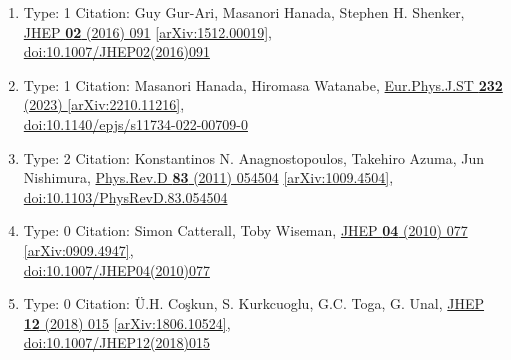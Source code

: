 \documentclass[a4paper,10pt]{article}
\begin{document}
\begin{enumerate}
\begin{enumerate}
  \item Type: 1 Citation: Guy Gur-Ari, Masanori Hanada, Stephen H. Shenker, \href{https://www.doi.org/10.1007/JHEP02(2016)091}{JHEP {\bf 02} (2016) 091}  \href{https://arxiv.org/abs/1512.00019}{[arXiv:1512.00019]},\\\href{https://www.doi.org/10.1007/JHEP02(2016)091}{doi:10.1007/JHEP02(2016)091}
  \item Type: 1 Citation: Masanori Hanada, Hiromasa Watanabe, \href{https://www.doi.org/10.1140/epjs/s11734-022-00709-0}{Eur.Phys.J.ST {\bf 232} (2023) }  \href{https://arxiv.org/abs/2210.11216}{[arXiv:2210.11216]},\\\href{https://www.doi.org/10.1140/epjs/s11734-022-00709-0}{doi:10.1140/epjs/s11734-022-00709-0}
  \item Type: 2 Citation: Konstantinos N. Anagnostopoulos, Takehiro Azuma, Jun Nishimura, \href{https://www.doi.org/10.1103/PhysRevD.83.054504}{Phys.Rev.D {\bf 83} (2011) 054504}  \href{https://arxiv.org/abs/1009.4504}{[arXiv:1009.4504]},\\\href{https://www.doi.org/10.1103/PhysRevD.83.054504}{doi:10.1103/PhysRevD.83.054504}
  \item Type: 0 Citation: Simon Catterall, Toby Wiseman, \href{https://www.doi.org/10.1007/JHEP04(2010)077}{JHEP {\bf 04} (2010) 077}  \href{https://arxiv.org/abs/0909.4947}{[arXiv:0909.4947]},\\\href{https://www.doi.org/10.1007/JHEP04(2010)077}{doi:10.1007/JHEP04(2010)077}
  \item Type: 0 Citation: Ü.H. Coşkun, S. Kurkcuoglu, G.C. Toga, G. Unal, \href{https://www.doi.org/10.1007/JHEP12(2018)015}{JHEP {\bf 12} (2018) 015}  \href{https://arxiv.org/abs/1806.10524}{[arXiv:1806.10524]},\\\href{https://www.doi.org/10.1007/JHEP12(2018)015}{doi:10.1007/JHEP12(2018)015}

\end{enumerate}
\end{enumerate}
\end{document}
